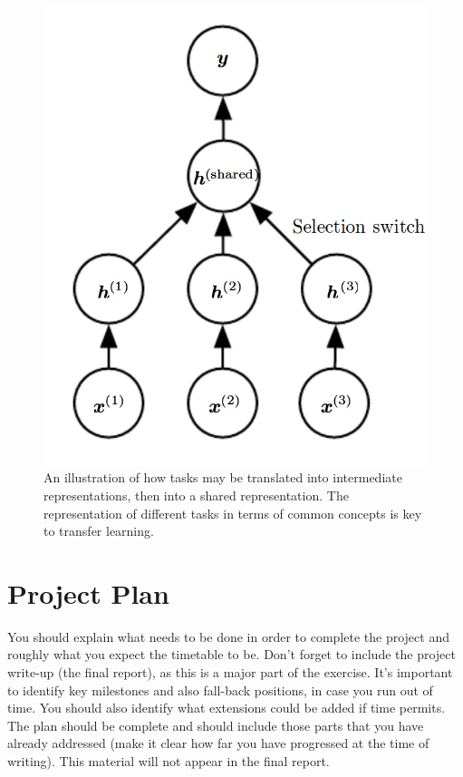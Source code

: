 \documentclass[12pt,twoside]{article}
\begin{document}
\begin{figure}
\includegraphics[scale=0.3]{figures/goodfellow_2015_15_2.png}
\centering
\captionsetup{justification=centering}
\caption{An illustration of how tasks may be translated into intermediate representations, then into a shared representation. The representation of different tasks in terms of common concepts is key to transfer learning. \cite{IanGoodfellowYoshuaBengio2015}}
\label{transfer_learning_graph_intuition}
\end{figure}

\newpage
\section{Project Plan}
You should explain what needs to be done in order to complete the project and roughly what you expect the timetable to be. Don’t forget to include the project write-up (the final report), as this is a major part of the exercise. It’s important to identify key milestones and also fall-back positions, in case you run out of time.  You should also identify what extensions could be added if time permits.  The plan should be complete and should include those parts that you have already addressed (make it clear how far you have progressed at the time of writing).  This material will not appear in the final report.
\end{document}
